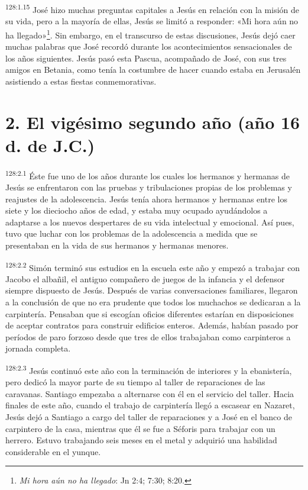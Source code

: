 \par
\textsuperscript{128:1.15} José hizo muchas preguntas capitales a Jesús en relación con la misión de su vida, pero a la mayoría de ellas, Jesús se limitó a responder: «Mi hora aún no ha llegado»\footnote{\textit{Mi hora aún no ha llegado}: Jn 2:4; 7:30; 8:20.}. Sin embargo, en el transcurso de estas discusiones, Jesús dejó caer muchas palabras que José recordó durante los acontecimientos sensacionales de los años siguientes. Jesús pasó esta Pascua, acompañado de José, con sus tres amigos en Betania, como tenía la costumbre de hacer cuando estaba en Jerusalén asistiendo a estas fiestas conmemorativas.

\section*{2. El vigésimo segundo año (año 16 d. de J.C.)}
\par
\textsuperscript{128:2.1} Éste fue uno de los años durante los cuales los hermanos y hermanas de Jesús se enfrentaron con las pruebas y tribulaciones propias de los problemas y reajustes de la adolescencia. Jesús tenía ahora hermanos y hermanas entre los siete y los dieciocho años de edad, y estaba muy ocupado ayudándolos a adaptarse a los nuevos despertares de su vida intelectual y emocional. Así pues, tuvo que luchar con los problemas de la adolescencia a medida que se presentaban en la vida de sus hermanos y hermanas menores.

\par
\textsuperscript{128:2.2} Simón terminó sus estudios en la escuela este año y empezó a trabajar con Jacobo el albañil, el antiguo compañero de juegos de la infancia y el defensor siempre dispuesto de Jesús. Después de varias conversaciones familiares, llegaron a la conclusión de que no era prudente que todos los muchachos se dedicaran a la carpintería. Pensaban que si escogían oficios diferentes estarían en disposiciones de aceptar contratos para construir edificios enteros. Además, habían pasado por períodos de paro forzoso desde que tres de ellos trabajaban como carpinteros a jornada completa.

\par
\textsuperscript{128:2.3} Jesús continuó este año con la terminación de interiores y la ebanistería, pero dedicó la mayor parte de su tiempo al taller de reparaciones de las caravanas. Santiago empezaba a alternarse con él en el servicio del taller. Hacia finales de este año, cuando el trabajo de carpintería llegó a escasear en Nazaret, Jesús dejó a Santiago a cargo del taller de reparaciones y a José en el banco de carpintero de la casa, mientras que él se fue a Séforis para trabajar con un herrero. Estuvo trabajando seis meses en el metal y adquirió una habilidad considerable en el yunque.

